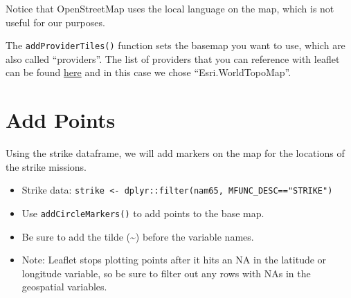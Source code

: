 \documentclass[oneside]{memoir}
\newenvironment{Shaded}{\begin{snugshade}}{\end{snugshade}}
\newcommand{\KeywordTok}[1]{\textcolor[rgb]{0.13,0.29,0.53}{\textbf{#1}}}
\newcommand{\DataTypeTok}[1]{\textcolor[rgb]{0.13,0.29,0.53}{#1}}
\newcommand{\DecValTok}[1]{\textcolor[rgb]{0.00,0.00,0.81}{#1}}
\newcommand{\StringTok}[1]{\textcolor[rgb]{0.31,0.60,0.02}{#1}}
\newcommand{\OperatorTok}[1]{\textcolor[rgb]{0.81,0.36,0.00}{\textbf{#1}}}
\newcommand{\NormalTok}[1]{#1}
\theoremstyle{definition}
\theoremstyle{definition}
\theoremstyle{definition}
\theoremstyle{remark}
\begin{document}
\begin{Shaded}
\end{Shaded}

Notice that OpenStreetMap uses the local language on the map, which is
not useful for our purposes.

The \texttt{addProviderTiles()} function sets the basemap you want to
use, which are also called ``providers''. The list of providers that you
can reference with leaflet can be found
\href{https://leaflet-extras.github.io/leaflet-providers/preview/}{here}
and in this case we chose ``Esri.WorldTopoMap''.

\begin{Shaded}
\end{Shaded}

\section{Add Points}\label{add-points}

Using the strike dataframe, we will add markers on the map for the
locations of the strike missions.

\begin{itemize}
\item
  Strike data:
  \texttt{strike\ \textless{}-\ dplyr::filter(nam65,\ MFUNC\_DESC=="STRIKE")}
\item
  Use \texttt{addCircleMarkers()} to add points to the base map.
\item
  Be sure to add the tilde (\textasciitilde{}) before the variable
  names.
\item
  Note: Leaflet stops plotting points after it hits an NA in the
  latitude or longitude variable, so be sure to filter out any rows with
  NAs in the geospatial variables.
\end{itemize}
\end{document}
